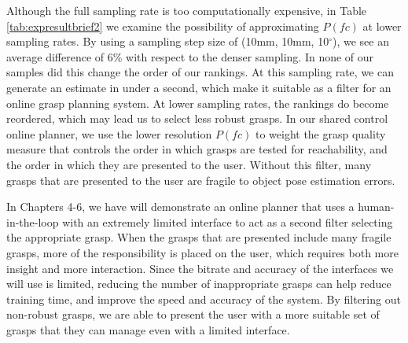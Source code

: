 Although the full sampling rate is too computationally expensive, in Table \ref{tab:expresultbrief2} we examine the possibility of approximating $P(fc)$ at lower sampling rates. By using a sampling step size of (10mm, 10mm, 10$^\circ$), we see an average difference of 6\% with respect to the denser sampling. In none of our samples did this change the order of our rankings. At this sampling rate, we can generate an estimate in under a second, which make it suitable as a filter for an online grasp planning system. At lower sampling rates, the rankings do become reordered, which may lead us to select less robust grasps. In our shared control online planner, we use the lower resolution $P(fc)$ to weight the grasp quality measure that controls the order in which grasps are tested for reachability, and the order in which they are presented to the user. Without this filter, many grasps that are presented to the user are fragile to object pose estimation errors.   

In Chapters 4-6, we have will demonstrate an online planner that uses a human-in-the-loop with an extremely limited interface to act as a second filter selecting the appropriate grasp. When the grasps that are presented include many fragile grasps, more of the responsibility is placed on the user, which requires both more insight and more interaction. Since the bitrate and accuracy of the interfaces we will use is limited, reducing the number of inappropriate grasps can help reduce training time, and improve the speed and accuracy of the system.  By filtering out non-robust grasps, we are able to present the user with a more suitable set of grasps that they can manage even with a limited interface. 
